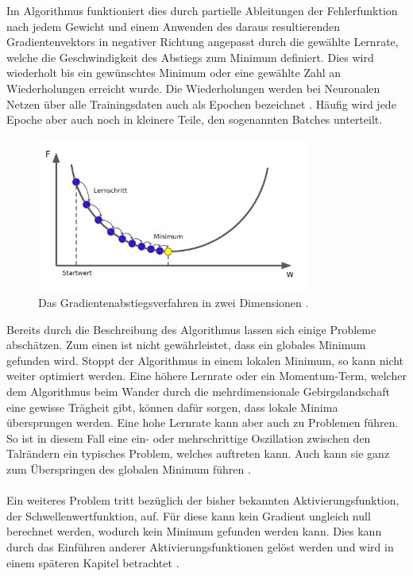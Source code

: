 \documentclass[11pt,bibliography=totocnumbered]{scrartcl}
\begin{document}
Im Algorithmus funktioniert dies durch partielle Ableitungen der Fehlerfunktion nach jedem Gewicht und einem Anwenden des daraus resultierenden Gradientenvektors in negativer Richtung angepasst durch die gewählte Lernrate, welche die Geschwindigkeit des Abstiegs zum Minimum definiert. Dies wird wiederholt bis ein gewünschtes Minimum oder eine gewählte Zahl an Wiederholungen erreicht wurde. Die Wiederholungen werden bei Neuronalen Netzen über alle Trainingsdaten auch als Epochen bezeichnet \cite[S.29-30]{BA}\cite[S.41]{NN}\cite[S.31]{DEEP_LEARNING}. Häufig wird jede Epoche aber auch noch in kleinere Teile, den sogenannten Batches unterteilt.
\begin{figure}[H]
	\centering
	\includegraphics[width=0.8\textwidth]{2DGradient}
	\vspace*{-5mm}
	\caption[Gradientenabstiegsverfahren in zwei Dimensionen]{Das Gradientenabstiegsverfahren in zwei Dimensionen \cite[S.113]{MACHINE_LEARNING}.}
	\label{fig:2DGrad}
\end{figure}
\vspace*{-5mm}
Bereits durch die Beschreibung des Algorithmus lassen sich einige Probleme abschätzen. Zum einen ist nicht gewährleistet, dass ein globales Minimum gefunden wird. Stoppt der Algorithmus in einem lokalen Minimum, so kann nicht weiter optimiert werden. Eine höhere Lernrate oder ein Momentum-Term, welcher dem Algorithmus beim Wander durch die mehrdimensionale Gebirgslandschaft eine gewisse Trägheit gibt, können dafür sorgen, dass lokale Minima übersprungen werden. Eine hohe Lernrate kann aber auch zu Problemen führen. So ist in diesem Fall eine ein- oder mehrschrittige Oszillation zwischen den Talrändern ein typisches Problem, welches auftreten kann. Auch kann sie ganz zum Überspringen des globalen Minimum führen \cite[S.30]{BA}\cite[S.46-47]{NN}.
\\\\
Ein weiteres Problem tritt bezüglich der bisher bekannten Aktivierungsfunktion, der Schwellenwertfunktion, auf. Für diese kann kein Gradient ungleich null berechnet werden, wodurch kein Minimum gefunden werden kann. Dies kann durch das Einführen anderer Aktivierungsfunktionen gelöst werden und wird in einem späteren Kapitel betrachtet \cite[S.31-32]{BA}\cite[S.262]{MACHINE_LEARNING}.
\end{document}
